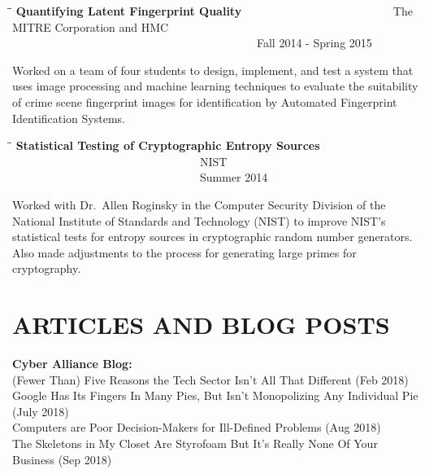 \documentclass{res}
\begin{document}
\begin{resume}
   \begin{tabbing}
   \hspace{2in}\=  \hspace{1.63in}\= \kill %
    {\bf Quantifying Latent Fingerprint Quality} \>~~~~~~~~~~~~~~~~~~~~~~~~~~The MITRE Corporation
    and HMC  \>~~~~~~~~~~~~~~~~~~~~~~~~~~~~~~~~~~~~~~~~~~~Fall 2014 - Spring 2015\\                       
   \end{tabbing}\vspace{-30pt}      %
    Worked on a team of four students to design, implement, and test a system that uses image processing and machine learning techniques to evaluate the suitability of crime scene fingerprint images for identification by Automated Fingerprint Identification Systems.

	\begin{tabbing}
	\hspace{3in}\=  \hspace{1.63in}\= \kill %
	{\bf Statistical Testing of Cryptographic Entropy Sources} \>~~~~~~~~~~~~~~~~~~~~~~~~~~~~~~~~~NIST 
 \>~~~~~~~~~~~~~~~~~~~~~~~~~~~~~~~~~Summer 2014\\      
	\end{tabbing} \vspace{-30pt}
	Worked with Dr.~Allen Roginsky in the Computer Security Division of the National Institute of Standards and Technology (NIST) to improve NIST's statistical tests for entropy sources in cryptographic random number generators.  Also made adjustments to the process for generating large primes for cryptography.
\\




\section{ARTICLES AND BLOG POSTS}  
\vspace{0.1in}

\textbf{Cyber Alliance Blog:} \\         
    (Fewer Than) Five Reasons the Tech Sector Isn't All That Different (Feb 2018) \\
    Google Has Its Fingers In Many Pies, But Isn't Monopolizing Any Individual Pie (July 2018) \\
    Computers are Poor Decision-Makers for Ill-Defined Problems (Aug 2018) \\
    The Skeletons in My Closet Are Styrofoam But It's Really None Of Your Business (Sep 2018) 


\end{resume}
\end{document}
